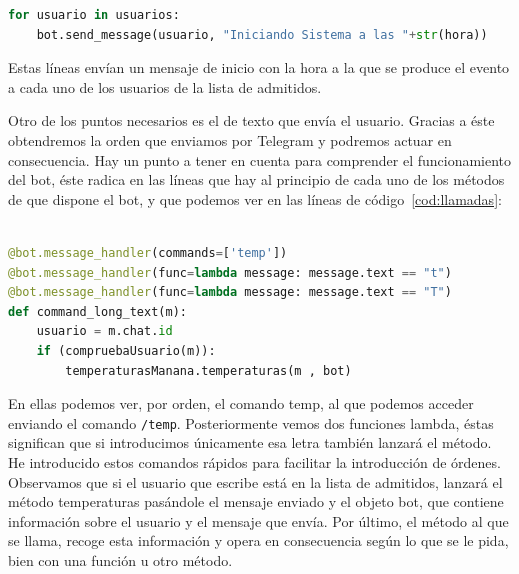 \begin{lstlisting}[language=Python, caption={Código para el envío de mensajes al inicio del bot.}, label={cod:mensajeInicio}]
for usuario in usuarios:
    bot.send_message(usuario, "Iniciando Sistema a las "+str(hora))
\end{lstlisting}

Estas líneas envían un mensaje de inicio con la hora a la que se produce el evento a cada uno de los usuarios de la lista de admitidos.

Otro de los puntos necesarios es el de texto que envía el usuario. Gracias a éste obtendremos la orden que enviamos por Telegram y podremos actuar en consecuencia.
Hay un punto a tener en cuenta para comprender el funcionamiento del bot, éste radica en las líneas que hay al principio de cada uno de los métodos de que dispone el bot, y que podemos ver en las líneas de código~\ref{cod:llamadas}:~\\~\\

\begin{lstlisting}[language=Python, caption={Código de llamada a funciones desde el bot.}, label={cod:llamadas}]
@bot.message_handler(commands=['temp'])
@bot.message_handler(func=lambda message: message.text == "t")
@bot.message_handler(func=lambda message: message.text == "T")
def command_long_text(m):
    usuario = m.chat.id
    if (compruebaUsuario(m)):
        temperaturasManana.temperaturas(m , bot)
\end{lstlisting}

En ellas podemos ver, por orden, el comando temp, al que podemos acceder enviando el comando \texttt{/temp}. Posteriormente vemos dos funciones lambda, éstas significan que si introducimos únicamente esa letra también lanzará el método. He introducido estos comandos rápidos para facilitar la introducción de órdenes.
Observamos que si el usuario que escribe está en la lista de admitidos, lanzará el método temperaturas pasándole el mensaje enviado y el objeto bot, que contiene información sobre el usuario y el mensaje que envía.
Por último, el método al que se llama, recoge esta información y opera en consecuencia según lo que se le pida, bien con una función u otro método.